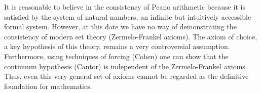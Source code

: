 \documentclass[12pt]{article}
\begin{document}
It is reasonable to believe in the consistency of Peano arithmetic
because it is satisfied by the system of natural numbers, an infinite
but intuitively accessible formal system.  However, at this date we
have no way of demonstrating the consistency of modern set theory
(Zermelo-Frankel axioms).  The axiom of choice, a key hypothesis
of this theory, remains a very controversial assumption.
Furthermore, using techniques of forcing (Cohen) one can show that the
continuum hypothesis (Cantor) is independent of the Zermelo-Frankel
axioms.  Thus, even this very general set of axioms cannot be regarded
as the definitive foundation for mathematics.
\end{document}
